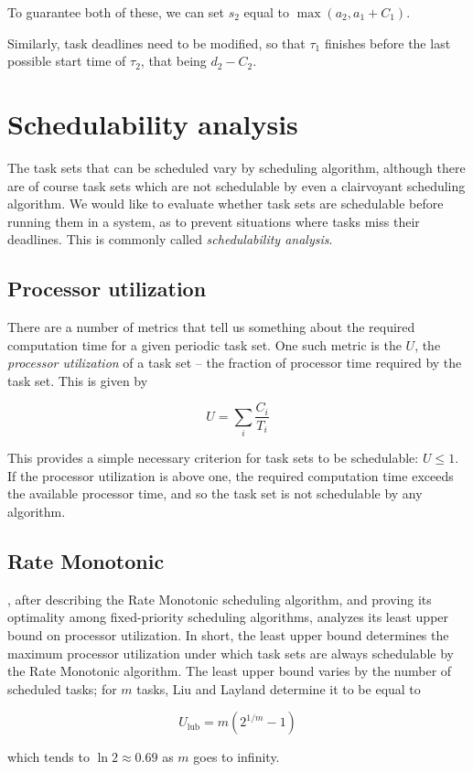 \documentclass[twoside]{uva-inf-bachelor-thesis}
\newcommand{\task}[1]{\ensuremath{\tau_#1}}
\begin{document}
To guarantee both of these, we can set $s_2$ equal to $\max(a_2, a_1 + C_1)$.

Similarly, task deadlines need to be modified, so that \task{1} finishes before the last possible start time of \task{2}, that being $d_2 - C_2$.

\section{Schedulability analysis}
The task sets that can be scheduled vary by scheduling algorithm, although there are of course task sets which are not schedulable by even a clairvoyant scheduling algorithm. We would like to evaluate whether task sets are schedulable before running them in a system, as to prevent situations where tasks miss their deadlines. This is commonly called \emph{schedulability analysis}.

\subsection{Processor utilization}
There are a number of metrics that tell us something about the required computation time for a given periodic task set. One such metric is the $U$, the \emph{processor utilization} of a task set -- the fraction of processor time required by the task set. This is given by

\[ U = \sum_i \dfrac{C_i}{T_i} \]

This provides a simple necessary criterion for task sets to be schedulable: $U \le 1$. If the processor utilization is above one, the required computation time exceeds the available processor time, and so the task set is not schedulable by any algorithm.

\subsection{Rate Monotonic}
\textcite{Liu1973}, after describing the Rate Monotonic scheduling algorithm, and proving its optimality among fixed-priority scheduling algorithms, analyzes its least upper bound on processor utilization. In short, the least upper bound determines the maximum processor utilization under which task sets are always schedulable by the Rate Monotonic algorithm. The least upper bound varies by the number of scheduled tasks; for $m$ tasks, Liu and Layland determine it to be equal to

\[ U_{\text{lub}} = m(2^{1/m} - 1) \]

\noindent which tends to $\ln 2 \approx 0.69$ as $m$ goes to infinity.
\end{document}
